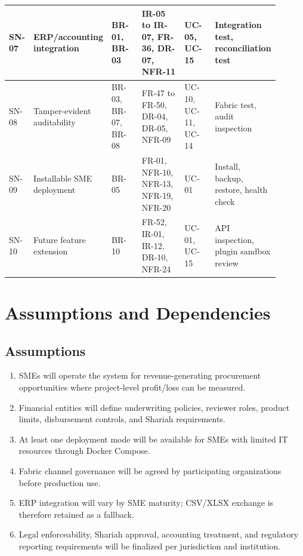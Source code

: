 \documentclass[11pt,a4paper]{article}
\begin{document}
\begin{landscape}
\begin{footnotesize}
\begin{longtable}{@{}p{0.08\linewidth}p{0.16\linewidth}p{0.14\linewidth}p{0.22\linewidth}p{0.14\linewidth}p{0.16\linewidth}@{}}
SN-07 & ERP/accounting integration & BR-01, BR-03 & IR-05 to IR-07, FR-36, DR-07, NFR-11 & UC-05, UC-15 & Integration test, reconciliation test \\ \hline
SN-08 & Tamper-evident auditability & BR-03, BR-07, BR-08 & FR-47 to FR-50, DR-04, DR-05, NFR-09 & UC-10, UC-11, UC-14 & Fabric test, audit inspection \\ \hline
SN-09 & Installable SME deployment & BR-05 & FR-01, NFR-10, NFR-13, NFR-19, NFR-20 & UC-01 & Install, backup, restore, health check \\ \hline
SN-10 & Future feature extension & BR-10 & FR-52, IR-01, IR-12, DR-10, NFR-24 & UC-01, UC-15 & API inspection, plugin sandbox review \\ \hline

\end{longtable}
\end{footnotesize}
\end{landscape}

\appendix
\section{Assumptions and Dependencies}

\subsection{Assumptions}
\begin{enumerate}
  \item SMEs will operate the system for revenue-generating procurement opportunities where project-level profit/loss can be measured.
  \item Financial entities will define underwriting policies, reviewer roles, product limits, disbursement controls, and Shariah requirements.
  \item At least one deployment mode will be available for SMEs with limited IT resources through Docker Compose.
  \item Fabric channel governance will be agreed by participating organizations before production use.
  \item ERP integration will vary by SME maturity; CSV/XLSX exchange is therefore retained as a fallback.
  \item Legal enforceability, Shariah approval, accounting treatment, and regulatory reporting requirements will be finalized per jurisdiction and institution.
\end{enumerate}
\end{document}
